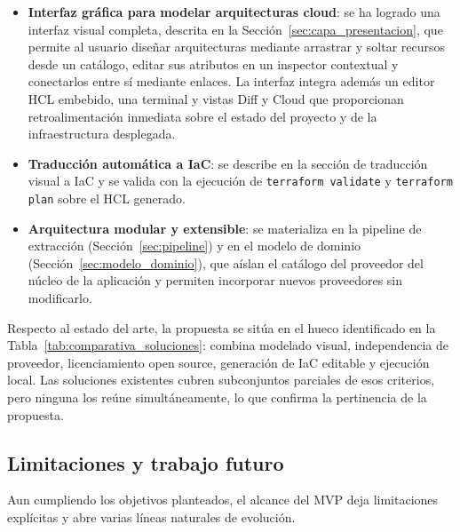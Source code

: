 \documentclass{article}
\begin{document}
{        \begin{itemize}[leftmargin=*, itemsep=2pt]
            \item \textbf{Interfaz gráfica para modelar arquitecturas cloud}:
            se ha logrado una interfaz visual completa, descrita en la
            Sección~\ref{sec:capa_presentacion}, que permite al usuario diseñar
            arquitecturas mediante arrastrar y soltar recursos desde un catálogo,
            editar sus atributos en un inspector contextual y conectarlos entre sí
            mediante enlaces. La interfaz integra además un editor HCL embebido,
            una terminal y vistas Diff y Cloud que proporcionan retroalimentación
            inmediata sobre el estado del proyecto y de la infraestructura
            desplegada.
            \item \textbf{Traducción automática a IaC}: se describe en la sección
            de traducción visual a IaC y se valida con la ejecución de
            \texttt{terraform validate} y \texttt{terraform plan} sobre el HCL
            generado.
            \item \textbf{Arquitectura modular y extensible}: se materializa en
            la pipeline de extracción (Sección~\ref{sec:pipeline}) y en el modelo
            de dominio (Sección~\ref{sec:modelo_dominio}), que aíslan el catálogo
            del proveedor del núcleo de la aplicación y permiten incorporar
            nuevos proveedores sin modificarlo.
        \end{itemize}

        \justify
        Respecto al estado del arte, la propuesta se sitúa en el hueco
        identificado en la
        Tabla~\ref{tab:comparativa_soluciones}: combina modelado visual,
        independencia de proveedor, licenciamiento open source, generación de
        IaC editable y ejecución local. Las soluciones existentes cubren
        subconjuntos parciales de esos criterios, pero ninguna los reúne
        simultáneamente, lo que confirma la pertinencia de la propuesta.

        \subsection{Limitaciones y trabajo futuro}
        \justify
        Aun cumpliendo los objetivos planteados, el alcance del MVP deja
        limitaciones explícitas y abre varias líneas naturales de evolución.

}
\end{document}
